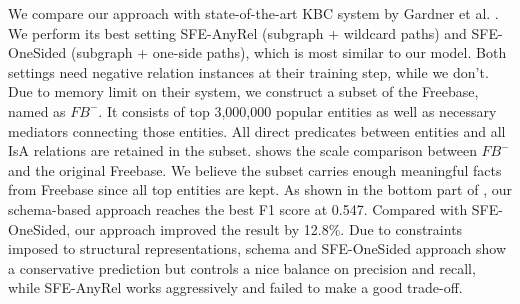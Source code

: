 We compare our approach with state-of-the-art KBC system by
Gardner et al. .
We perform its best setting SFE-AnyRel (subgraph
+ wildcard paths) and SFE-OneSided (subgraph + one-side paths),
which is most similar to our model.
Both settings need negative relation instances at their training step, while we don't.
Due to memory limit on their system, we construct a subset of the Freebase, named as $FB^-$.
It consists of top 3,000,000 popular entities as well as necessary mediators connecting those entities.
All direct predicates between entities and all IsA relations are retained in the subset.
 shows the scale comparison between $FB^-$ and the original Freebase.
We believe the subset carries enough meaningful facts from Freebase since all top entities are kept.
As shown in the bottom part of , our schema-based approach reaches the best F1 score at 0.547.
Compared with SFE-OneSided, our approach improved the result by 12.8\%.
Due to constraints imposed to structural representations, schema and SFE-OneSided approach 
show a conservative prediction but controls a nice balance on precision and recall,
while SFE-AnyRel works aggressively and failed to make a good trade-off.




